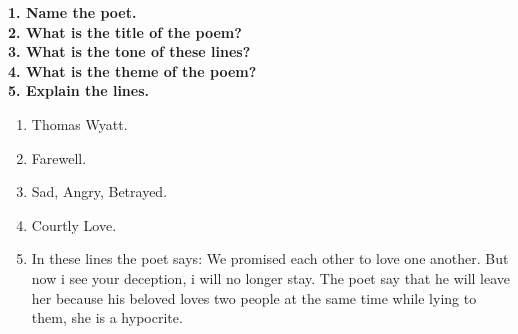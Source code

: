 \documentclass[12pt, a4paper]{article}
\newcommand{\df}[1]{
  {\fontsub\textbf{#1}}
}
\begin{document}
\df{
1. Name the poet.\\
2. What is the title of the poem?\\
3. What is the tone of these lines?\\
4. What is the theme of the poem?\\
5. Explain the lines.
}

\begin{enumerate}

  \item Thomas Wyatt.
  \item Farewell.
  \item Sad, Angry, Betrayed.
  \item Courtly Love.
  \item In these lines the poet says: We promised each other to love one another. But now i see your 
deception, i will no longer stay. The poet say that he will leave her
because his beloved loves two people at the same time while lying to them, she is a hypocrite.

\end{enumerate}
\end{document}
